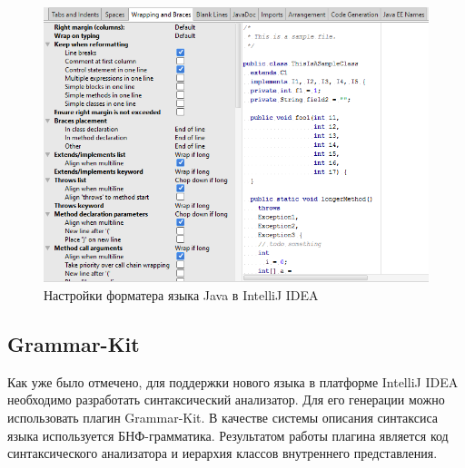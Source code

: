 \begin{figure}[t]
    \centering
    \includegraphics[width=.9\textwidth]{Ozernykh/images/settingsjava.PNG}
    \caption{Настройки форматера языка Java в IntelliJ IDEA}
    \label{ov:settings}
\end{figure}

\subsection{Grammar-Kit}
Как уже было отмечено, для поддержки нового языка в платформе IntelliJ IDEA необходимо разработать синтаксический анализатор.
Для его генерации можно использовать плагин Grammar-Kit.
В качестве системы описания синтаксиса языка используется БНФ-грамматика.
Результатом работы плагина является код синтаксического анализатора и иерархия классов внутреннего представления. %

